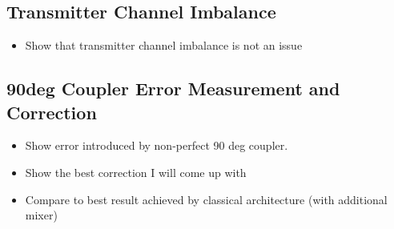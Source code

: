 \subsection{Transmitter Channel Imbalance}
\begin{itemize}
\item Show that transmitter channel imbalance is not an issue
\end{itemize}

\subsection{90deg Coupler Error Measurement and Correction}
\begin{itemize}
\item Show error introduced by non-perfect 90 deg coupler.
\item Show the best correction I will come up with
\item Compare to best result achieved by classical architecture (with additional mixer)
\end{itemize}

